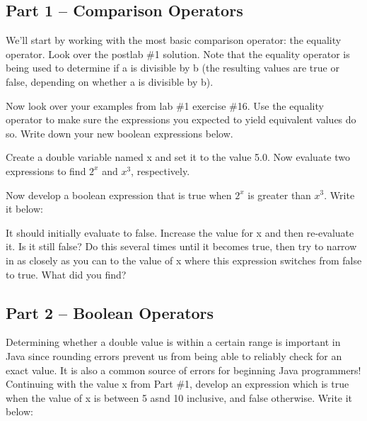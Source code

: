 \subsection{Part 1 -- Comparison Operators}

We'll start by working with the most basic comparison operator: the equality operator. Look over the postlab \#1 solution. Note that the equality operator is being used to determine if a is divisible by b (the resulting values are true or false, depending on whether a is divisible by b). 

\begin{exer} Now look over your examples from lab \#1 exercise \#16. Use the equality operator to make sure the expressions you expected to yield equivalent values do so. Write down your new boolean expressions below.

\evallinefour
\end{exer}

\begin{exer}
Create a double variable named x and set it to the value 5.0. Now evaluate two expressions to find $2^x$ and $x^3$, respectively. 

Now develop a boolean expression that is true when $2^x$ is greater than $x^3$. Write it below:

\evalline

It should initially evaluate to false. Increase the value for x and then re-evaluate it. Is it still false? Do this several times until it becomes true, then try to narrow in as closely as you can to the value of x where this expression switches from false to true. What did you find?

\evalline

\end{exer}

\initialbox


\subsection{Part 2 -- Boolean Operators}

\begin{exer}
Determining whether a double value is within a certain range is important in Java since rounding errors prevent us from being able to reliably check for an exact value. It is also a common source of errors for beginning Java programmers! Continuing with the value x from Part \#1, develop an expression which is true when the value of x is between 5 asnd 10 inclusive, and false otherwise. Write it below:

\evalline

\end{exer}

